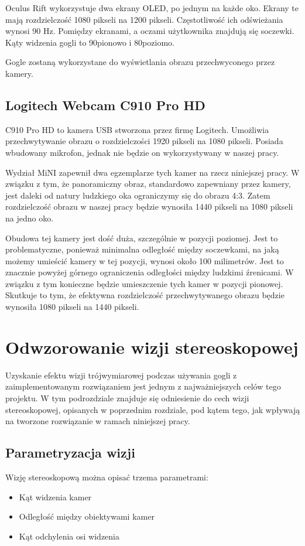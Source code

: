 \documentclass[a4paper,11pt,twoside]{report}
\theoremstyle{definition}
\begin{document}
Oculus Rift wykorzystuje dwa ekrany OLED, po jednym na każde oko. Ekrany te mają rozdzielczość 1080 pikseli na 1200 pikseli. Częstotliwość ich odświeżania wynosi 90 Hz. Pomiędzy ekranami, a oczami użytkownika znajdują się soczewki. Kąty widzenia gogli to 90\textdegree  pionowo i 80\textdegree  poziomo.

Gogle zostaną wykorzystane do wyświetlania obrazu przechwyconego przez kamery.

\subsection{Logitech Webcam C910 Pro HD}
C910 Pro HD to kamera USB stworzona przez firmę Logitech. Umożliwia przechwytywanie obrazu o rozdzielczości 1920 pikseli na 1080 pikseli. Posiada wbudowany mikrofon, jednak nie będzie on wykorzystywany w naszej pracy.

Wydział MiNI zapewnił dwa egzemplarze tych kamer na rzecz niniejszej pracy. W związku z tym, że panoramiczny obraz, standardowo zapewniany przez kamery, jest daleki od natury ludzkiego oka ograniczymy się do obrazu 4:3. Zatem rozdzielczość obrazu w naszej pracy będzie wynosiła 1440 pikseli na 1080 pikseli na jedno oko.

Obudowa tej kamery jest dość duża, szczególnie w pozycji poziomej. Jest to problematyczne, ponieważ minimalna odległość między soczewkami, na jaką możemy umieścić kamery w tej pozycji, wynosi około 100 milimetrów. Jest to znacznie powyżej górnego ograniczenia odległości między ludzkimi źrenicami. W związku z tym konieczne będzie umieszczenie tych kamer w pozycji pionowej. Skutkuje to tym, że efektywna rozdzielczość przechwytywanego obrazu będzie wynosiła 1080 pikseli na 1440 pikseli.

\section{Odwzorowanie wizji stereoskopowej}

Uzyskanie efektu wizji trójwymiarowej podczas używania gogli z zaimplementowanym rozwiązaniem jest jednym z najważniejszych celów tego projektu. W tym podrozdziale znajduje się odniesienie do cech wizji stereoskopowej, opisanych w poprzednim rozdziale, pod kątem tego, jak wpływają na tworzone rozwiązanie w ramach niniejszej pracy. 

\subsection{Parametryzacja wizji}
Wizję stereoskopową można opisać trzema parametrami:
\begin{itemize}
\item Kąt widzenia kamer
\item Odległość między obiektywami kamer
\item Kąt odchylenia osi widzenia
\end{itemize}
\end{document}
